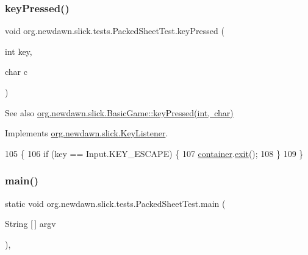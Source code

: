 \subsubsection{\texorpdfstring{key\+Pressed()}{keyPressed()}}
{\footnotesize\ttfamily void org.\+newdawn.\+slick.\+tests.\+Packed\+Sheet\+Test.\+key\+Pressed (\begin{DoxyParamCaption}\item[{int}]{key,  }\item[{char}]{c }\end{DoxyParamCaption})\hspace{0.3cm}{\ttfamily [inline]}}

\begin{DoxySeeAlso}{See also}
\mbox{\hyperlink{classorg_1_1newdawn_1_1slick_1_1_basic_game_a4fbb3345b5abf5ddd54a99466d07f02f}{org.\+newdawn.\+slick.\+Basic\+Game\+::key\+Pressed(int, char)}} 
\end{DoxySeeAlso}


Implements \mbox{\hyperlink{interfaceorg_1_1newdawn_1_1slick_1_1_key_listener_ac0b0568a21ef486c4f51382614c196ef}{org.\+newdawn.\+slick.\+Key\+Listener}}.


\begin{DoxyCode}
105                                             \{
106         \textcolor{keywordflow}{if} (key == Input.KEY\_ESCAPE) \{
107             \mbox{\hyperlink{classorg_1_1newdawn_1_1slick_1_1tests_1_1_packed_sheet_test_a627ba2a3381f2182796b91ede952fa0e}{container}}.\mbox{\hyperlink{classorg_1_1newdawn_1_1slick_1_1_game_container_a6d888463695fe3aac4123e72ac14480f}{exit}}();
108         \}
109     \}
\end{DoxyCode}
\mbox{\label{classorg_1_1newdawn_1_1slick_1_1tests_1_1_packed_sheet_test_a03199255b68c4a482981e6b097f208e6}} 
\subsubsection{\texorpdfstring{main()}{main()}}
{\footnotesize\ttfamily static void org.\+newdawn.\+slick.\+tests.\+Packed\+Sheet\+Test.\+main (\begin{DoxyParamCaption}\item[{String \mbox{[}$\,$\mbox{]}}]{argv }\end{DoxyParamCaption})\hspace{0.3cm}{\ttfamily [inline]}, {\ttfamily [static]}}

